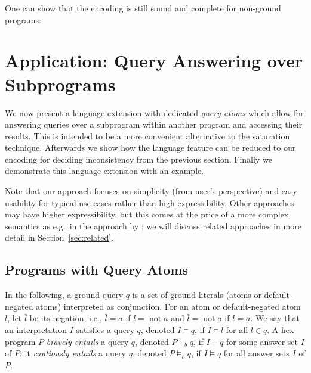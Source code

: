 \documentclass[11pt,fleqn,twoside]{article}
\def\naf{\ensuremath{\mathop{not}}}
\newcommand\hex{{\sc hex}\xspace}
\begin{document}
			One can show that the encoding is still sound and complete for non-ground programs:

			
			
	\section{Application: Query Answering over Subprograms}
	\label{sec:queryanswering}

		We now present a language extension with dedicated \emph{query atoms} which allow for answering queries over a subprogram within another program
		and accessing their results.
		This is intended to be a more convenient alternative to the saturation technique.
		Afterwards we show how the language feature can be reduced to our encoding for deciding inconsistency from the previous section.
		Finally we demonstrate this language extension with an example.
		
		Note that our approach focuses on simplicity (from user's perspective) and easy usability for typical use cases rather than high expressibility.
		Other approaches may have higher expressibility, but this comes at the price of a more complex semantics as e.g.~in the approach by ;
		we will discuss related approaches in more detail in Section~\ref{sec:related}.
	
		\subsection{Programs with Query Atoms}
		\label{sec:queryansweringencoding}

			In the following, a ground query $q$ is a set of ground literals (atoms or default-negated atoms) interpreted as conjunction.
			For an atom or default-negated atom $l$, let $\bar{l}$ be its negation, i.e., $\bar{l} = a$ if $l = \naf a$ and $\bar{l} = \naf a$ if $l = a$.
			We say that an interpretation $I$ satisfies a query $q$, denoted $I \models q$, if $I \models l$ for all $l \in q$.
			A \hex-program $P$ \emph{bravely entails} a query $q$, denoted $P \models_b q$, if $I \models q$ for some answer set $I$ of $P$;
			it \emph{cautiously entails} a query $q$, denoted $P \models_c q$, if $I \models q$ for all answer sets $I$ of $P$.
\end{document}
